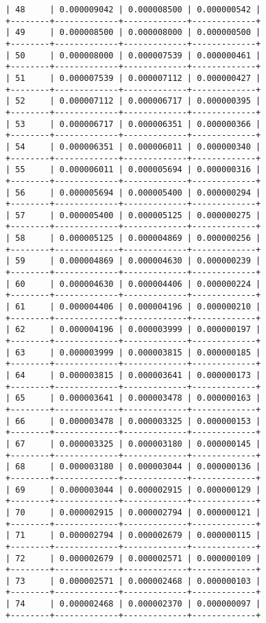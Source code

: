 \documentclass[11pt]{article}
\begin{document}
\begin{Verbatim}[commandchars=\\\{\}]
| 48     | 0.000009042 | 0.000008500 | 0.000000542 |
+--------+-------------+-------------+-------------+
| 49     | 0.000008500 | 0.000008000 | 0.000000500 |
+--------+-------------+-------------+-------------+
| 50     | 0.000008000 | 0.000007539 | 0.000000461 |
+--------+-------------+-------------+-------------+
| 51     | 0.000007539 | 0.000007112 | 0.000000427 |
+--------+-------------+-------------+-------------+
| 52     | 0.000007112 | 0.000006717 | 0.000000395 |
+--------+-------------+-------------+-------------+
| 53     | 0.000006717 | 0.000006351 | 0.000000366 |
+--------+-------------+-------------+-------------+
| 54     | 0.000006351 | 0.000006011 | 0.000000340 |
+--------+-------------+-------------+-------------+
| 55     | 0.000006011 | 0.000005694 | 0.000000316 |
+--------+-------------+-------------+-------------+
| 56     | 0.000005694 | 0.000005400 | 0.000000294 |
+--------+-------------+-------------+-------------+
| 57     | 0.000005400 | 0.000005125 | 0.000000275 |
+--------+-------------+-------------+-------------+
| 58     | 0.000005125 | 0.000004869 | 0.000000256 |
+--------+-------------+-------------+-------------+
| 59     | 0.000004869 | 0.000004630 | 0.000000239 |
+--------+-------------+-------------+-------------+
| 60     | 0.000004630 | 0.000004406 | 0.000000224 |
+--------+-------------+-------------+-------------+
| 61     | 0.000004406 | 0.000004196 | 0.000000210 |
+--------+-------------+-------------+-------------+
| 62     | 0.000004196 | 0.000003999 | 0.000000197 |
+--------+-------------+-------------+-------------+
| 63     | 0.000003999 | 0.000003815 | 0.000000185 |
+--------+-------------+-------------+-------------+
| 64     | 0.000003815 | 0.000003641 | 0.000000173 |
+--------+-------------+-------------+-------------+
| 65     | 0.000003641 | 0.000003478 | 0.000000163 |
+--------+-------------+-------------+-------------+
| 66     | 0.000003478 | 0.000003325 | 0.000000153 |
+--------+-------------+-------------+-------------+
| 67     | 0.000003325 | 0.000003180 | 0.000000145 |
+--------+-------------+-------------+-------------+
| 68     | 0.000003180 | 0.000003044 | 0.000000136 |
+--------+-------------+-------------+-------------+
| 69     | 0.000003044 | 0.000002915 | 0.000000129 |
+--------+-------------+-------------+-------------+
| 70     | 0.000002915 | 0.000002794 | 0.000000121 |
+--------+-------------+-------------+-------------+
| 71     | 0.000002794 | 0.000002679 | 0.000000115 |
+--------+-------------+-------------+-------------+
| 72     | 0.000002679 | 0.000002571 | 0.000000109 |
+--------+-------------+-------------+-------------+
| 73     | 0.000002571 | 0.000002468 | 0.000000103 |
+--------+-------------+-------------+-------------+
| 74     | 0.000002468 | 0.000002370 | 0.000000097 |
+--------+-------------+-------------+-------------+

    \end{Verbatim}
\end{document}
